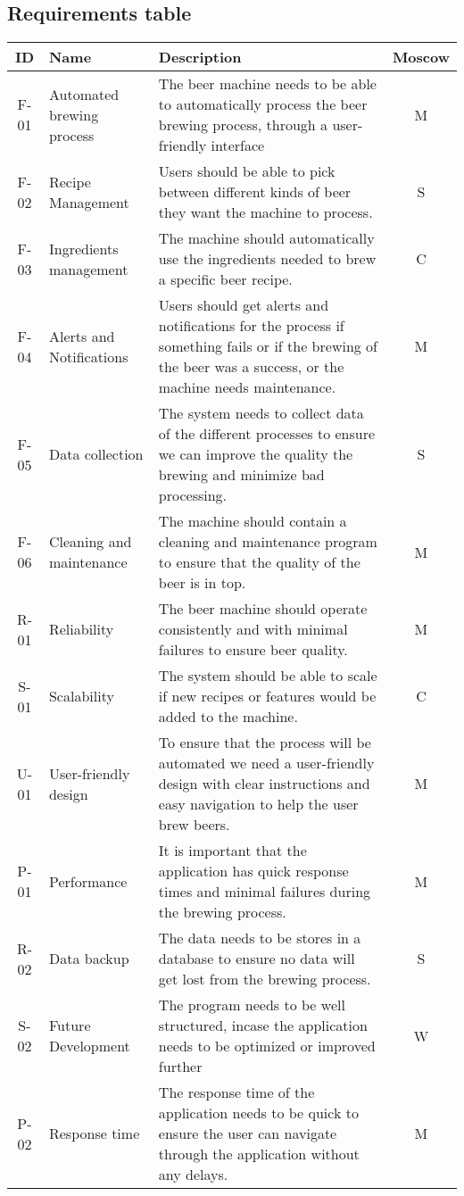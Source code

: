 \subsection{Requirements table}
\begin{center}
    \sloppy
    \begin{longtable}{|c|p{3.5cm}|p{7cm}|c|}
        \hline
        ID & Name & Description & Moscow \\ \hline
        F-01   & Automated brewing process & The beer machine needs to be able to automatically process the beer brewing process, through a user-friendly interface & M \\ \hline
        F-02   & Recipe Management & Users should be able to pick between different kinds of beer they want the machine to process. & S \\ \hline
        F-03   & Ingredients management & The machine should automatically use the ingredients needed to brew a specific beer recipe. & C \\ \hline
        F-04   & Alerts and Notifications & Users should get alerts and notifications for the process if something fails or if the brewing of the beer was a success, or the machine needs maintenance. & M \\ \hline
        F-05  & Data collection & The system needs to collect data of the different processes to ensure we can improve the quality the brewing and minimize bad processing. & S \\ \hline
        F-06   & Cleaning and maintenance & The machine should contain a cleaning and maintenance program to ensure that the quality of the beer is in top.& M \\ \hline
        R-01   & Reliability & The beer machine should operate consistently and with minimal failures to ensure beer quality. & M \\ \hline
        S-01   & Scalability & The system should be able to scale if new recipes or features would be added to the machine. & C \\ \hline
        U-01  & User-friendly design & To ensure that the process will be automated we need a user-friendly design with clear instructions and easy navigation to help the user brew beers. & M \\ \hline
        P-01   & Performance & It is important that the application has quick response times and minimal failures during the brewing process. & M \\ \hline
        R-02  & Data backup & The data needs to be stores in a database to ensure no data will get lost from the brewing process. & S \\ \hline
        S-02   & Future Development & The program needs to be well structured, incase the application needs to be optimized or improved further & W \\ \hline
        P-02   & Response time & The response time of the application needs to be quick to ensure the user can navigate through the application without any delays. & M \\ \hline


\end{longtable}
\end{center}
